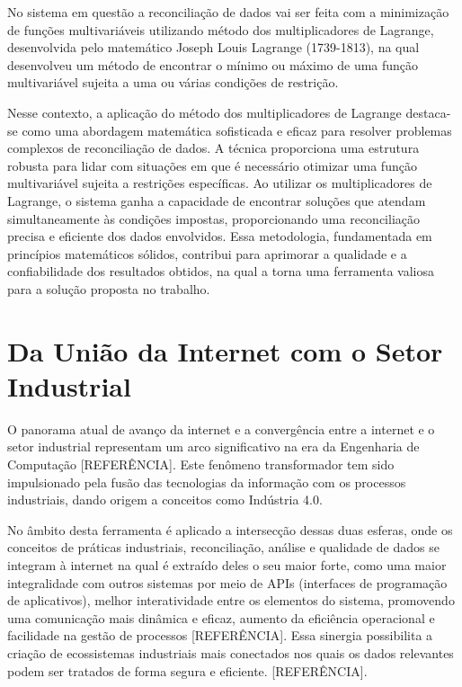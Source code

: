 
No sistema em questão a reconciliação de dados vai ser feita com a minimização de funções multivariáveis utilizando método dos multiplicadores de Lagrange, desenvolvida pelo matemático Joseph Louis Lagrange (1739-1813), na qual desenvolveu um método de encontrar o mínimo ou máximo de uma função multivariável sujeita a uma ou várias condições de restrição.

Nesse contexto, a aplicação do método dos multiplicadores de Lagrange destaca-se como uma abordagem matemática sofisticada e eficaz para resolver problemas complexos de reconciliação de dados. A técnica proporciona uma estrutura robusta para lidar com situações em que é necessário otimizar uma função multivariável sujeita a restrições específicas. Ao utilizar os multiplicadores de Lagrange, o sistema ganha a capacidade de encontrar soluções que atendam simultaneamente às condições impostas, proporcionando uma reconciliação precisa e eficiente dos dados envolvidos. Essa metodologia, fundamentada em princípios matemáticos sólidos, contribui para aprimorar a qualidade e a confiabilidade dos resultados obtidos, na qual a torna uma ferramenta valiosa para a solução proposta no trabalho.

\section{Da União da Internet com o Setor Industrial}

O panorama atual de avanço da internet e a convergência entre a internet e o setor industrial representam um arco significativo na era da Engenharia de Computação [REFERÊNCIA]. Este fenômeno transformador tem sido impulsionado pela fusão das tecnologias da informação com os processos industriais, dando origem a conceitos como Indústria 4.0. 

No âmbito desta ferramenta é aplicado a intersecção dessas duas esferas, onde os conceitos de práticas industriais, reconciliação, análise e qualidade de dados se integram à internet na qual é extraído deles o seu maior forte, como uma maior integralidade com outros sistemas por meio de APIs (interfaces de programação de aplicativos), melhor interatividade entre os elementos do sistema, promovendo uma comunicação mais dinâmica e eficaz, aumento da eficiência operacional e facilidade na gestão de processos [REFERÊNCIA]. Essa sinergia possibilita a criação de ecossistemas industriais mais conectados nos quais os dados relevantes podem ser tratados de forma segura e eficiente. [REFERÊNCIA].

